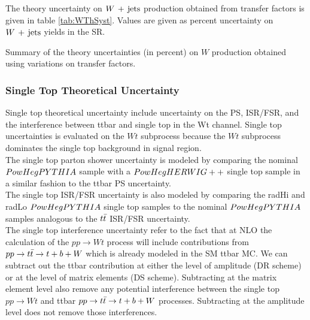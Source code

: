 \indent The theory uncertainty on $W\,+\,\mathrm{jets}$ production obtained from transfer factors is given in table \ref{tab:WThSyst}.  Values are given as percent uncertainty on $W\,+\,\mathrm{jets}$ yields in the SR.  \\

  \begin{table}[!h]
    \begin{center} \footnotesize

    \end{center}
    \caption{Summary of the theory uncertainties (in percent) on $W$ production obtained using variations on transfer factors. }
    \label{tab:WThSyst}
  \end{table}        

\subsubsection*{Single Top Theoretical Uncertainty}

\indent Single top theoretical uncertainty include uncertainty on the PS, ISR/FSR, and the interference between ttbar and single top in the Wt channel.  Single top uncertainties is evaluated on the $Wt$ subprocess because the $Wt$ subprocess dominates the single top background in signal region.  \\

\indent The single top parton shower uncertainty is modeled by comparing the nominal $PowHegPYTHIA$ sample with a $PowHegHERWIG++$ single top sample in a similar fashion to the ttbar PS uncertainty.  \\

\indent The single top ISR/FSR uncertainty is also modeled by comparing the radHi and radLo $PowHegPYTHIA$ single top samples to the nominal $PowHegPYTHIA$ samples analogous to the $t\bar{t}$ ISR/FSR uncertainty. \\

\indent The single top interference uncertainty refer to the fact that at NLO the calculation of the $pp \rightarrow Wt$ process will include contributions from $ pp \rightarrow t\bar{t} \rightarrow t + b + W$ which is already modeled in the SM ttbar MC.  We can subtract out the ttbar contribution at either the level of amplitude (DR scheme) or at the level of matrix elements (DS scheme).  Subtracting at the matrix element level also remove any potential interference between the single top $pp \rightarrow Wt$ and ttbar $ pp \rightarrow t\bar{t} \rightarrow t + b + W$ processes.  Subtracting at the amplitude level does not remove those interferences. \\

